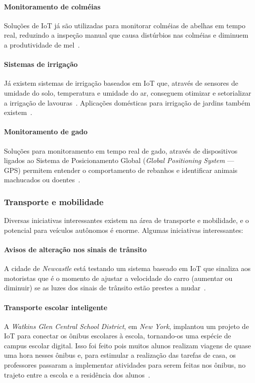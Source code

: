 \documentclass[pdftex, brazil, 12pt, twoside]{article}
\newcommand{\ingles}[1]{\textit{#1}}
\begin{document}
\paragraph{Monitoramento de colméias} Soluções de IoT já são utilizadas para
monitorar colméias de abelhas em tempo real, reduzindo a inspeção manual que causa
distúrbios nas colméias e diminuem a produtividade de mel~\citep{SilvaIoTColmeia2017}.

\paragraph{Sistemas de irrigação} Já existem sistemas de irrigação baseados em IoT
que, através de sensores de umidade do solo, temperatura e umidade do ar, conseguem
otimizar e setorializar a irrigação de lavouras~\citep{UKGOSWalportIoT2014}. Aplicações
domésticas para irrigação de jardins também existem~\citep{GrehsIrrigacaoIoT2016}.

\paragraph{Monitoramento de gado} Soluções para monitoramento em tempo real de gado,
através de dispositivos ligados ao Sistema de Posicionamento Global (\emph{Global
  Positioning System} --- GPS) permitem entender o comportamento de rebanhos e
identificar animais machucados ou doentes~\citep{SpinkIoTTrackAnimals2013}.


\subsubsection{Transporte e mobilidade}
\label{aplicacoes-iot-exemplos-transporte}

Diversas iniciativas interessantes existem na área de transporte e mobilidade,
e o potencial para veículos autônomos é enorme. Algumas iniciativas interessantes:

\paragraph{Avisos de alteração nos sinais de trânsito} A cidade de \ingles{Newcastle}
está testando um sistema baseado em IoT que sinaliza aos motoristas que é o momento
de ajustar a velocidade do carro (aumentar ou diminuir) se as luzes dos sinais
de trânsito estão prestes a mudar~\citep{UKGOSWalportIoT2014}.

\paragraph{Transporte escolar inteligente} A \ingles{Watkins Glen Central School District},
em \ingles{New York}, implantou um projeto de IoT para conectar os ônibus escolares
à escola, tornando-os uma espécie de campus escolar digital. Isso foi feito pois muitos
alunos realizam viagens de quase uma hora nesses ônibus e, para estimular a realização
das tarefas de casa, os professores passaram a implementar atividades para serem feitas
nos ônibus, no trajeto entre a escola e a residência dos alunos~\citep{GlenSchoolBusIoT2016}.
\end{document}
